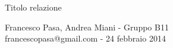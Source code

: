 \documentclass[11pt, twoside, a4paper]{article}
\begin{document}
\begin{center}

        {\huge Titolo relazione}
    \vspace{0.1cm}

      	{Francesco Pasa, Andrea Miani - Gruppo B11} \\
      	{francescopasa@gmail.com - 24 febbraio 2014}
    \vspace{-0.2cm}

\end{center}





\end{document}
